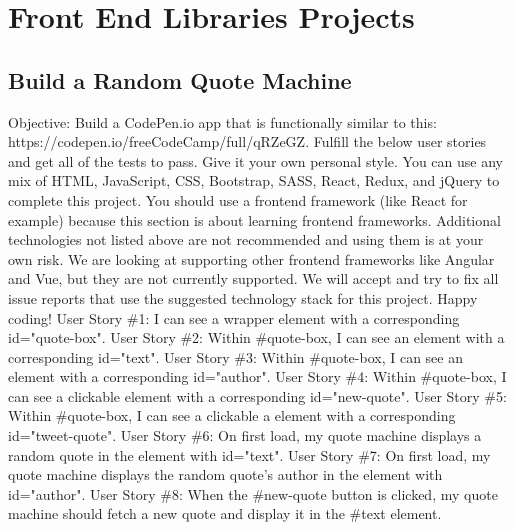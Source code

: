 \documentclass{article}%
\begin{document}
%
\newpage%
\section{Front End Libraries Projects}%
\label{sec:FrontEndLibrariesProjects}%
\subsection{Build a Random Quote Machine}%
\label{subsec:BuildaRandomQuoteMachine}%
Objective: Build a CodePen.io app that is functionally similar to this: https://codepen.io/freeCodeCamp/full/qRZeGZ.\newline%
Fulfill the below user stories and get all of the tests to pass. Give it your own personal style.\newline%
You can use any mix of HTML, JavaScript, CSS, Bootstrap, SASS, React, Redux, and jQuery to complete this project. You should use a frontend framework (like React for example) because this section is about learning frontend frameworks. Additional technologies not listed above are not recommended and using them is at your own risk. We are looking at supporting other frontend frameworks like Angular and Vue, but they are not currently supported. We will accept and try to fix all issue reports that use the suggested technology stack for this project. Happy coding!\newline%
User Story \#1: I can see a wrapper element with a corresponding id="quote{-}box".\newline%
User Story \#2: Within \#quote{-}box, I can see an element with a corresponding id="text".\newline%
User Story \#3: Within \#quote{-}box, I can see an element with a corresponding id="author".\newline%
User Story \#4: Within \#quote{-}box, I can see a clickable element with a corresponding id="new{-}quote".\newline%
User Story \#5: Within \#quote{-}box, I can see a clickable a element with a corresponding id="tweet{-}quote".\newline%
User Story \#6: On first load, my quote machine displays a random quote in the element with id="text".\newline%
User Story \#7: On first load, my quote machine displays the random quote's author in the element with id="author".\newline%
User Story \#8: When the \#new{-}quote button is clicked, my quote machine should fetch a new quote and display it in the \#text element.\newline%
\end{document}

